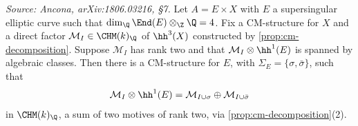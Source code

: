 \begin{lemma}
  \label{lem:exotic-split}
  \textit{Source: Ancona, arXiv:1806.03216, §7.}
  Let \(A = E \times X\) with \(E\) a supersingular elliptic curve such that
  \(\dim_\Q \End(E) \otimes_\Z \Q = 4\). Fix a CM-structure for \(X\) and a direct
  factor \(\mathcal{M}_I \in \CHM(k)_{\Q}\) of \(\hh^3(X)\) constructed by
  \cref{prop:cm-decomposition}. Suppose \(\mathcal{M}_I\) has rank two and that
  \(\mathcal{M}_I \otimes \hh^1(E)\) is spanned by algebraic classes. Then there
  is a CM-structure for \(E\), with \(\Sigma_E = \{\sigma, \bar\sigma\}\), such
  that
  \[\mathcal{M}_I \otimes \hh^1(E) =
    \mathcal{M}_{I \cup \sigma} \oplus \mathcal{M}_{I \cup \bar\sigma}\]
  in \(\CHM(k)_{\Q}\), a sum of two motives of rank two, via
  \cref{prop:cm-decomposition}(2).
\end{lemma}

